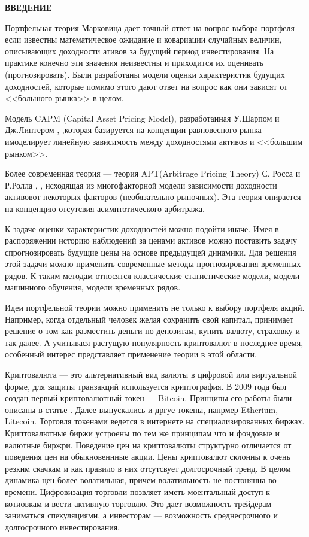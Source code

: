 \newpage
{}
\begin{center}
	\textbf{\large ВВЕДЕНИЕ}
\end{center}

Портфельная теория Марковица дает точный ответ на вопрос выбора портфеля если известны математическое ожидание
и ковариации случайных величин, описывающих доходности ативов за будущий период инвестирования. На практике конечно эти значения неизвестны
и приходится их оценивать (прогнозировать). 
Были разработаны модели оценки характеристик будущих доходностей, которые помимо этого дают ответ на вопрос как они зависят
от <<большого рынка>> в целом. 

Модель CAPM (Capital Asset Pricing Model), разработанная У.Шарпом и Дж.Линтером \cite{sharp_capm}, \cite{linter_capm},которая базируется на
концепции равновесного рынка имоделирует линейную зависимость между доходностями активов и <<большим рынком>>.

Более современная теория --- теория APT(Arbitrage Pricing Theory) С. Росса и Р.Ролла \cite{ross_apt}, \cite{roll_apt}, исходящая из
многофакторной модели зависимости доходности активовот некоторых факторов (необязательно рыночных). 
Эта теория опирается на концепцию отсутсвия асимптотического арбитража.

К задаче оценки характеристик доходностей можно подойти иначе. Имея в распоряжении историю наблюдений за ценами активов можно поставить задачу
спрогнозировать будущие цены на основе предыдущей динамики. Для решения этой задачи можно применить современные методы
прогнозирования временных рядов. К таким методам относятся классические статистические модели, модели машинного обучения, модели временных рядов.

Идеи портфельной теории можно применить не только к выбору портфеля акций. Например, когда отдельный человек желая сохранить свой капитал,
принимает решение о том как разместить деньги по депозитам, купить валюту, страховку и так далее. 
А учитывася растущую популярность криптовалют в последнее время, особенный интерес представляет применение теории в этой области.

Криптовалюта --- это альтернативный вид валюты в цифровой или виртуальной форме, для защиты транзакций используется криптография. 
В 2009 года был создан первый криптовалютный токен --- Bitcoin. Принципы его работы были описаны в статье \cite{satoshi}. Далее выпускались
и дргуе токены, напрмер Etherium, Litecoin.
Торговля токенами ведется в интернете на специализированных биржах. Криптовалютные биржи устроены по тем же принципам что и фондовые и валютные биржри.
Поведение цен на криптовалюты структурно отличается от поведения цен на обыкновеннные акции. Цены криптовалют склонны к очень резким скачкам и как
правило в них отсутсвует долгосрочный тренд. В целом динамика цен более волатильная, причем волатильность не постонянна во времени.
Цифровизация торговли позвляет иметь моентальный доступ к котиовкам и вести активную торговлю. 
Это дает возможность трейдерам заниматься спекуляциями, а инвесторам --- возможность среднесрочного и долгосрочного инвестирования.

